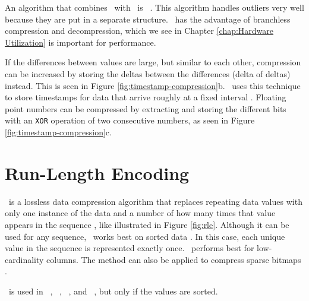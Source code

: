 An algorithm that combines \dele~with \bp~is \pfdelta~\cite{Bjorklund2011-wh}. This algorithm handles outliers very well because they are put in a separate structure. \pfdelta~has the advantage of branchless compression and decompression, which we see in Chapter \ref{chap:Hardware Utilization} is important for performance.


If the differences between values are large, but similar to each other, compression can be increased by storing the deltas between the differences (delta of deltas) instead. This is seen in Figure \ref{fig:timestamp-compression}b. \gorilla~uses this technique to store timestamps for data that arrive roughly at a fixed interval \cite{Pelkonen2015-ko}. Floating point numbers can be compressed by extracting and storing the different bits with an \texttt{XOR} operation of two consecutive numbers, as seen in Figure \ref{fig:timestamp-compression}c.

\section{Run-Length Encoding}
\label{sec:Run-Length Encoding}


\rle~is a lossless data compression algorithm that replaces repeating data values with only one instance of the data and a number of how many times that value appears in the sequence \cite{Stoimen_undated-js}, like illustrated in Figure \ref{fig:rle}. Although it can be used for any sequence, \rle~works best on sorted data \cite{Bjorklund2011-wh, Holloway2008-rr}. In this case, each unique value in the sequence is represented exactly once. \rle~performs best for low-cardinality columns. The method can also be applied to compress sparse bitmaps \cite{Stonebraker2005-qz}.

\rle~is used in \cstore~\cite{Stonebraker2005-qz}, \vertica~\cite{Lamb2012-kg}, \oracle~\cite{Oracle2015-fs}, and \sapnw~\cite{Lemke2010-is}, but only if the values are sorted. 

